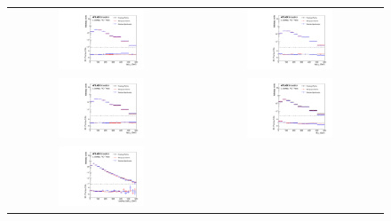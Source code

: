 \begin{figure}[tp!]
\begin{center}
\begin{tabular}{cc}
\includegraphics[width=0.48\textwidth]{Modeling/Figures/default_tt1bq_top_pt_norm} &
\includegraphics[width=0.48\textwidth]{Modeling/Figures/default_tt1gbbq_top_pt_norm} \\
\includegraphics[width=0.48\textwidth]{Modeling/Figures/default_tt2bq_top_pt_norm} &
\includegraphics[width=0.48\textwidth]{Modeling/Figures/default_tt2bq_ttbar_pt_norm} \\
\includegraphics[width=0.48\textwidth]{Modeling/Figures/default_tt2bq_q1_pt_norm} &

\end{tabular}
\end{center}
\end{figure}
